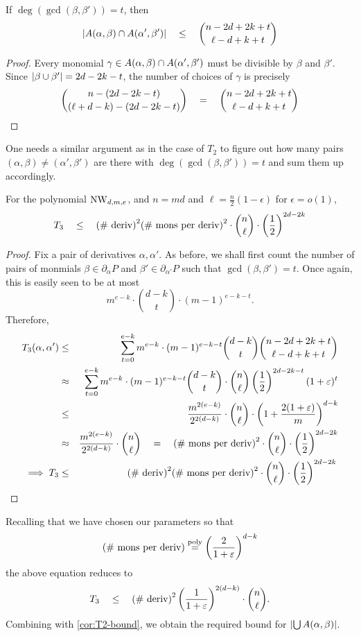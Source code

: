 \begin{observation}\label{obs:T3-proxy}
If $\deg(\gcd(\beta, \beta')) = t$, then
\[
\left|A(\alpha, \beta) \cap A(\alpha', \beta')\right| \quad \leq \quad \binom{n - 2d + 2k + t}{\ell - d + k +t}
\]
\end{observation}
\begin{proof}
Every monomial $\gamma \in A(\alpha, \beta) \cap A(\alpha', \beta')$ must be divisible by $\beta$ and $\beta'$. 
Since $\left|\beta \cup \beta'\right| = 2d - 2k - t$, the number of choices of $\gamma$ is precisely
\[
\binom{n - (2d - 2k -t)}{(\ell + d - k) - (2d - 2k - t)} \quad = \quad \binom{n - 2d + 2k + t}{\ell - d + k + t}\qedhere
\]
\end{proof}

One needs a similar argument as in the case of $T_2$ to figure out how many pairs $(\alpha, \beta) \neq (\alpha',\beta')$ are there with $\deg(\gcd(\beta, \beta')) = t$ and sum them up accordingly. 

\begin{lemma}[\cite{KS14}] \label{lem:T3-bound}
For the polynomial $\mathrm{NW}_{d,m,e}$, and $n = md$ and $\ell = \frac{n}{2}(1 - \epsilon)$ for $\epsilon = o(1)$, 
\[
T_3 \quad \leq \quad \text{(\# deriv)}^2 \text{(\# mons per deriv)}^2 \cdot \binom{n}{\ell}\cdot \left(\frac{1}{2}\right)^{2d - 2k}
\]
\end{lemma}
\begin{proof}
Fix a pair of derivatives $\alpha,\alpha'$. As before, we shall first count the number of pairs of monmials $\beta \in \partial_\alpha P$ and $\beta' \in \partial_{\alpha'} P$ such that $\gcd(\beta, \beta') = t$. 
Once again, this is easily seen to be at most
\[
m^{e-k} \cdot \binom{d-k}{t} \cdot (m-1)^{e-k-t}. 
\]
Therefore,
\begin{eqnarray*}
T_3(\alpha, \alpha') & \leq & \sum_{t=0}^{e-k} m^{e-k} \cdot (m-1)^{e-k -t} \binom{d-k}{t} \binom{n- 2d + 2k +t}{\ell - d + k + t}\\
& \approx & \sum_{t=0}^{e-k} m^{e-k} \cdot (m-1)^{e-k -t} \binom{d-k}{t} \cdot \binom{n}{\ell} \left(\frac{1}{2}\right)^{2d - 2k -t}  (1+\varepsilon)^{t}\\
& \leq & \frac{m^{2(e-k)}}{2^{2(d-k)}} \cdot \binom{n}{\ell} \cdot \left(1 + \frac{2(1+\varepsilon)}{m}\right)^{d-k}\\
& \approx & \frac{m^{2(e-k)}}{2^{2(d-k)}} \cdot \binom{n}{\ell} \quad = \quad \text{(\# mons per deriv)}^2 \cdot \binom{n}{\ell}\cdot \left(\frac{1}{2}\right)^{2d - 2k}\\
\implies T_3 & \leq & \text{(\# deriv)}^2 \text{(\# mons per deriv)}^2 \cdot \binom{n}{\ell}\cdot \left(\frac{1}{2}\right)^{2d - 2k}\qedhere
\end{eqnarray*}
\end{proof}
\noindent
Recalling that we have chosen our parameters so that 
\[
\text{(\# mons per deriv)} \stackrel{\mathrm{poly}}{=} \left(\frac{2}{1+\varepsilon}\right)^{d-k}
\]
the above equation reduces to 
\[
T_3 \quad \leq \quad \text{(\# deriv)}^2 \left(\frac{1}{1+\varepsilon}\right)^{2(d-k)} \cdot \binom{n}{\ell}.
\]
Combining with \autoref{cor:T2-bound}, we obtain the required bound for $\left|\bigcup A(\alpha, \beta)\right|$. 

